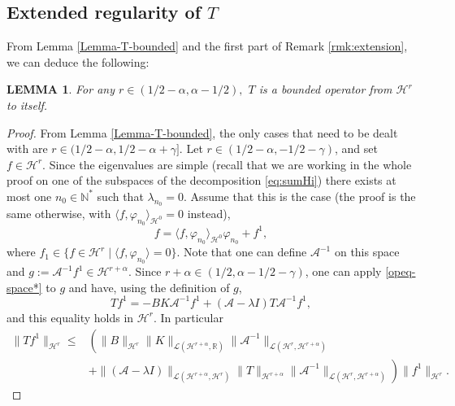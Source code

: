 \documentclass[11pt, dvipsnames]{amsart}
\newtheorem{lem}[theorem]{LEMMA}
\begin{document}
{\color{black}
\subsection{Extended regularity of $T$}
\label{app:regT}

 From Lemma \ref{Lemma-T-bounded} and the first part of Remark \ref{rmk:extension}, we can deduce the following:
\begin{lem}
    \label{Lemma-T-bounded-bis}
   For any $r\in (1/2-\alpha,\alpha-1/2),$ $T$ is a bounded operator from $\mathcal{H}^r$ to itself.  
\end{lem}
\begin{proof}
From Lemma \ref{Lemma-T-bounded}, the only cases that need to be dealt with are $r\in(1/2-\alpha,1/2-\alpha+\gamma]$. Let $r\in (1/2-\alpha,-1/2-\gamma)$, and set $f\in \mathcal{H}^{r}$. Since the eigenvalues are simple (recall that we are working in the whole proof on one of the subspaces of the decomposition \eqref{eq:sumHi}) there exists at most one $n_{0}\in\mathbb{N}^{*}$ such that $\lambda_{n_{0}}=0$. Assume that this is the case (the proof is the same otherwise, with $\langle f, \varphi_{n_{0}}\rangle_{\mathcal{H}^{0}}=0$ instead), 
\begin{equation}
    f = \langle f, \varphi_{n_{0}}\rangle_{\mathcal{H}^{0}}\varphi_{n_{0}}+f^{1},
\end{equation}
where $f_{1}\in \{f\in\mathcal{H}^{r}\;|\;\langle f,\varphi_{n_{0}}\rangle =0\}$. Note that one can define $\mathcal{A}^{-1}$ on this space and $g:=\mathcal{A}^{-1}f^{1}\in \mathcal{H}^{r+\alpha}$. Since $r+\alpha \in(1/2,\alpha-1/2-\gamma)$, one can apply \eqref{opeq-space*} to $g$ and have, using the definition of $g$,
\begin{equation}
Tf^{1} = -BK\mathcal{A}^{-1}f^{1} +(\mathcal{A}-\lambda I)T\mathcal{A}^{-1}f^{1},
\end{equation}
and this equality holds in $\mathcal{H}^{r}$. In particular
\begin{equation}
\begin{split}
    \|Tf^{1}\|_{\mathcal{H}^{r}}\leq &\left(\|B\|_{\mathcal{H}^{r}}\|K\|_{\mathcal{L}(\mathcal{H}^{r+\alpha},\mathbb{R})}\|\mathcal{A}^{-1}\|_{\mathcal{L}(\mathcal{H}^{r},\mathcal{H}^{r+\alpha})}\right.\\
    &\left.+\|(\mathcal{A}-\lambda I)\|_{\mathcal{L}(\mathcal{H}^{r+\alpha},\mathcal{H}^{r})}\|T\|_{\mathcal{H}^{r+\alpha}}\|\mathcal{A}^{-1}\|_{\mathcal{L}(\mathcal{H}^{r},\mathcal{H}^{r+\alpha})}
    \right)\|f^{1}\|_{\mathcal{H}^{r}}.
    \end{split}

\end{equation}
\end{proof}}
\end{document}
